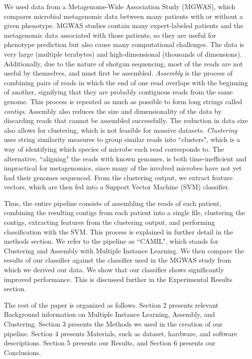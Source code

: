 We used data from a Metagenome-Wide Association Study (MGWAS), which compares microbial metagenomic data between many patients with or without a given phenotype. MGWAS studies contain many expert-labeled patients and the metagenomic data associated with those patients, so they are useful for phenotype prediction but also cause many computational challenges. The data is very large (multiple terabytes) and high-dimensional (thousands of dimensions). Additionally, due to the nature of shotgun sequencing, most of the reads are not useful by themselves, and must first be assembled. \emph{Assembly} is the process of combining pairs of reads in which the end of one read overlaps with the beginning of another, signifying that they are probably contiguous reads from the same genome. This process is repeated as much as possible to form long strings called \emph{contigs}. Assembly also reduces the size and dimensionality of the data by discarding reads that cannot be assembled successfully. The reduction in data size also allows for clustering, which is not feasible for massive datasets. \emph{Clustering} uses string similarity measures to group similar reads into ``clusters", which is a way of identifying which species of microbe each read corresponds to. The alternative, ``aligning" the reads with known genomes, is both time-inefficient and impractical for metagenomics, since many of the involved microbes have not yet had their genomes sequenced. From the clustering output, we extract feature vectors, which are then fed into a Support Vector Machine (SVM) classifier. 

Thus, the entire pipeline consists of assembling the reads of each patient, combining the resulting contigs from each patient into a single file, clustering the contigs, extracting features from the clustering output, and performing classification with the SVM. This process is explained in further detail in the methods section. We refer to the pipeline as ``CAMIL", which stands for Clustering and Assembly with Multiple Instance Learning. We then compare the results of our classifier against the classifier used in the MGWAS study from which we derived our data. We show that our classifier shows significantly improved performance. This is discussed further in the Experimental Results section.

The rest of the paper is organized as follows. Section 2 presents relevant Background information on  Multiple Instance Learning, Assembly, and Clustering. Section 3 presents the Methods we used in the creation of our pipeline. Section 4 presents Materials, such as dataset, hardware, and software descriptions. Section 5 presents our Results, and Section 6 presents our Conclusions.